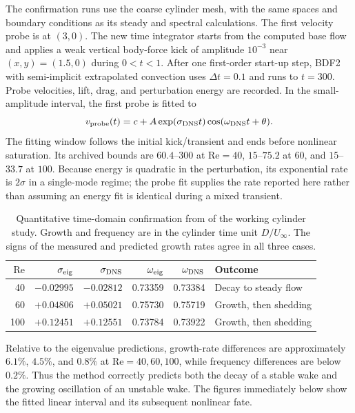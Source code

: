 The confirmation runs use the coarse cylinder mesh, with the same spaces and boundary conditions as its steady and spectral calculations. The first velocity probe is at $(3,0)$. The new time integrator starts from the computed base flow and applies a weak vertical body-force kick of amplitude $10^{-3}$ near $(x,y)=(1.5,0)$ during $0<t<1$. After one first-order start-up step, BDF2 with semi-implicit extrapolated convection uses $\Delta t=0.1$ and runs to $t=300$. Probe velocities, lift, drag, and perturbation energy are recorded. In the small-amplitude interval, the first probe is fitted to
\begin{equation}
v_{\rm probe}(t)=c+A\exp(\sigma_{\rm DNS}t)\cos(\omega_{\rm DNS}t+\theta).
\label{eq:cylinder-fit}
\end{equation}
The fitting window follows the initial kick/transient and ends before nonlinear saturation. Its archived bounds are $60.4$--$300$ at $\mathrm{Re}=40$, $15$--$75.2$ at $60$, and $15$--$33.7$ at $100$. Because energy is quadratic in the perturbation, its exponential rate is $2\sigma$ in a single-mode regime; the probe fit supplies the rate reported here rather than assuming an energy fit is identical during a mixed transient.

\begin{table}[htbp]\centering\small
\begin{tabular}{rrrrrl}\toprule
$\mathrm{Re}$ & $\sigma_{\rm eig}$ & $\sigma_{\rm DNS}$ & $\omega_{\rm eig}$ & $\omega_{\rm DNS}$ & Outcome\\\midrule
40 & $-0.02995$ & $-0.02812$ & 0.73359 & 0.73384 & Decay to steady flow\\
60 & $+0.04806$ & $+0.05021$ & 0.75730 & 0.75719 & Growth, then shedding\\
100 & $+0.12451$ & $+0.12551$ & 0.73784 & 0.73922 & Growth, then shedding\\\bottomrule
\end{tabular}
\caption[Cylinder time-domain confirmation]{Quantitative time-domain confirmation from  of the working cylinder study. Growth and frequency are in the cylinder time unit $D/U_\infty$. The signs of the measured and predicted growth rates agree in all three cases.}
\label{tab:cylinder-dns}
\end{table}
Relative to the eigenvalue predictions, growth-rate differences are approximately $6.1\%$, $4.5\%$, and $0.8\%$ at $\mathrm{Re}=40,60,100$, while frequency differences are below $0.2\%$. Thus the method correctly predicts both the decay of a stable wake and the growing oscillation of an unstable wake. The figures immediately below show the fitted linear interval and its subsequent nonlinear fate.

